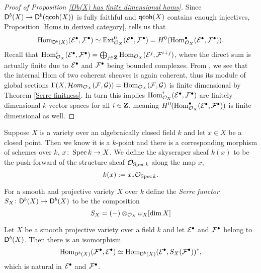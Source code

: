 \begin{proof}[Proof of Proposition \ref{Db(X) has finite dimensional homs}]
    Since $\mathsf{D}^b(X) \to \mathsf{D}^b(\mathsf{qcoh}(X))$ is fully faithful and $\mathsf{qcoh}(X)$ contains enough injectives, Proposition \ref{Homs in derived category}, tells us that
    \[
        \operatorname{Hom}_{\mathsf{D}^b(X)}(\mathcal E^\bullet, \mathcal F^\bullet) \simeq \operatorname{Ext}^0_{{\mathcal{O}_{X}}}(\mathcal E^\bullet, \mathcal F^\bullet) = H^0(\operatorname{Hom}^\bullet_{{\mathcal{O}_{X}}}(\mathcal E^\bullet, \mathcal F^\bullet)).
    \]
    Recall that $\operatorname{Hom}^i_{{\mathcal{O}_{X}}}(\mathcal E^\bullet, \mathcal F^\bullet) = \bigoplus_{j \in \mathbf Z} \operatorname{Hom}_{{\mathcal{O}_{X}}}(\mathcal E^j, \mathcal F^{i+j})$, where the direct sum is actually finite due to $\mathcal E^\bullet$ and $\mathcal F^\bullet$ being bounded complexes. From \cite[\href{https://stacks.math.columbia.edu/tag/01CQ}{Tag 01CQ}]{stacks-project}, we see that the internal Hom of two coherent sheaves is again coherent, thus its module of global sections $\Gamma(X, \localhom_{\struct{X}}(\F, \G)) = \Hom_{\struct{X}}(\F, \G)$ is finite dimensional by Theorem \ref{Serre finitness}. In turn this implies $\operatorname{Hom}^i_{{\mathcal{O}_{X}}}(\mathcal E^\bullet, \mathcal F^\bullet)$ are finitely dimensional $k$-vector spaces for all $i \in \mathbf Z$, meaning $H^0(\operatorname{Hom}^\bullet_{{\mathcal{O}_{X}}}(\mathcal E^\bullet, \mathcal F^\bullet))$ is finite dimensional as well. 
\end{proof}


Suppose $X$ is a variety over an algebraically closed field $k$ and let $x \in X$ be a closed point. Then we know it is a $k$-point and there is a corresponding morphism of schemes over $k$, $x \colon \operatorname{Spec}k \to X$. We define the skyscraper sheaf $k(x)$ to be the push-forward of the structure sheaf ${\mathcal{O}_{\operatorname{Spec}k}}$ along the map $x$, 
\[
    k(x) := x_* {\mathcal{O}_{\operatorname{Spec}k}}.
\]

\begin{definition}
    \label{Serre functor on Db(X)}
    For a smooth and projective variety $X$ over $k$ define the \emph{Serre functor} $S_X \colon \mathsf{D}^b(X) \to \mathsf{D}^b(X)$ to be the composition
    \[
        S_X = (-) \otimes_{\mathcal{O}_{X}} \omega_X[\dim X]
    \]
\end{definition}

\begin{theorem}
    \label{Serre duality for derived cats}
    Let $X$ be a smooth projective variety over a field $k$ and let $\mathcal E^\bullet$ and $\mathcal F^\bullet$ belong to $\mathsf{D}^b(X)$. Then there is an isomorphism
    \[
        \operatorname{Hom}_{\mathsf{D}^b(X)}(\mathcal F^\bullet, \mathcal E^\bullet) \simeq \operatorname{Hom}_{\mathsf{D}^b(X)}(\mathcal E^\bullet, S_X(\mathcal F^\bullet))^*,
    \]
    which is natural in $\mathcal E^\bullet$ and $\mathcal F^\bullet$.
\end{theorem}


